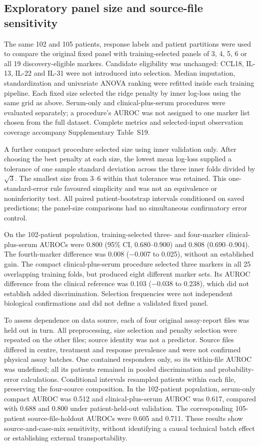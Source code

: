 \documentclass[10pt,a4paper]{article}
\begin{document}
\subsection{Exploratory panel size and source-file sensitivity}
The same 102 and 105 patients, response labels and patient partitions were used to compare the original fixed panel with training-selected panels of 3, 4, 5, 6 or all 19 discovery-eligible markers. Candidate eligibility was unchanged: CCL18, IL-13, IL-22 and IL-31 were not introduced into selection. Median imputation, standardization and univariate ANOVA ranking were refitted inside each training pipeline. Each fixed size selected the ridge penalty by inner log-loss using the same grid as above. Serum-only and clinical-plus-serum procedures were evaluated separately; a procedure's AUROC was not assigned to one marker list chosen from the full dataset. Complete metrics and selected-input observation coverage accompany Supplementary Table~S19.

A further compact procedure selected size using inner validation only. After choosing the best penalty at each size, the lowest mean log-loss supplied a tolerance of one sample standard deviation across the three inner folds divided by $\sqrt{3}$. The smallest size from 3--6 within that tolerance was retained. This one-standard-error rule favoured simplicity and was not an equivalence or noninferiority test. All paired patient-bootstrap intervals conditioned on saved predictions; the panel-size comparisons had no simultaneous confirmatory error control.

On the 102-patient population, training-selected three- and four-marker clinical-plus-serum AUROCs were 0.800 (95\% CI, 0.680--0.900) and 0.808 (0.690--0.904). The fourth-marker difference was 0.008 ($-$0.007 to 0.025), without an established gain. The compact clinical-plus-serum procedure selected three markers in all 25 overlapping training folds, but produced eight different marker sets. Its AUROC difference from the clinical reference was 0.103 ($-$0.038 to 0.238), which did not establish added discrimination. Selection frequencies were not independent biological confirmations and did not define a validated fixed panel.

To assess dependence on data source, each of four original assay-report files was held out in turn. All preprocessing, size selection and penalty selection were repeated on the other files; source identity was not a predictor. Source files differed in centre, treatment and response prevalence and were not confirmed physical assay batches. One contained responders only, so its within-file AUROC was undefined; all its patients remained in pooled discrimination and probability-error calculations. Conditional intervals resampled patients within each file, preserving the four-source composition. In the 102-patient population, serum-only compact AUROC was 0.512 and clinical-plus-serum AUROC was 0.617, compared with 0.688 and 0.800 under patient-held-out validation. The corresponding 105-patient source-file-holdout AUROCs were 0.605 and 0.711. These results show source-and-case-mix sensitivity, without identifying a causal technical batch effect or establishing external transportability.
\end{document}
